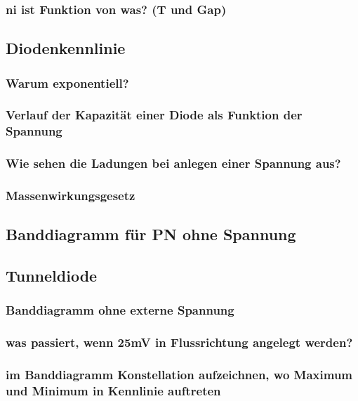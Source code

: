 \documentclass{article}
\begin{document}
	\subsubsection{ni ist Funktion von was? (T und Gap)}
	
\subsection{Diodenkennlinie }\label{k5:diode}
    \subsubsection{Warum exponentiell?}
    \subsubsection{Verlauf der Kapazit\"at einer Diode als Funktion der Spannung}
    \subsubsection{Wie sehen die Ladungen bei anlegen einer Spannung aus?}
    \subsubsection{Massenwirkungsgesetz}

\subsection{Banddiagramm für PN ohne Spannung }\label{k5:pnBand}

\subsection{Tunneldiode }\label{k5:tunnelDiode}
    \subsubsection{Banddiagramm ohne externe Spannung}
    \subsubsection{was passiert, wenn 25mV in Flussrichtung angelegt werden?}
    \subsubsection{im Banddiagramm Konstellation aufzeichnen, wo Maximum und Minimum in Kennlinie auftreten}
    
\end{document}

